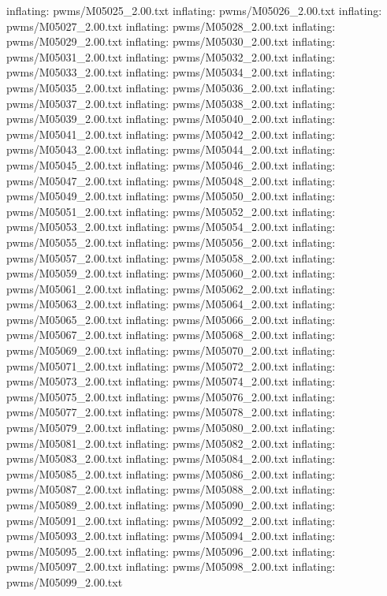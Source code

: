 \documentclass[letterpaper,10pt,english]{sphinxmanual}
\begin{document}
{\begin{sphinxVerbatim}[commandchars=\\\{\}]
  inflating: pwms/M05025\_2.00.txt
  inflating: pwms/M05026\_2.00.txt
  inflating: pwms/M05027\_2.00.txt
  inflating: pwms/M05028\_2.00.txt
  inflating: pwms/M05029\_2.00.txt
  inflating: pwms/M05030\_2.00.txt
  inflating: pwms/M05031\_2.00.txt
  inflating: pwms/M05032\_2.00.txt
  inflating: pwms/M05033\_2.00.txt
  inflating: pwms/M05034\_2.00.txt
  inflating: pwms/M05035\_2.00.txt
  inflating: pwms/M05036\_2.00.txt
  inflating: pwms/M05037\_2.00.txt
  inflating: pwms/M05038\_2.00.txt
  inflating: pwms/M05039\_2.00.txt
  inflating: pwms/M05040\_2.00.txt
  inflating: pwms/M05041\_2.00.txt
  inflating: pwms/M05042\_2.00.txt
  inflating: pwms/M05043\_2.00.txt
  inflating: pwms/M05044\_2.00.txt
  inflating: pwms/M05045\_2.00.txt
  inflating: pwms/M05046\_2.00.txt
  inflating: pwms/M05047\_2.00.txt
  inflating: pwms/M05048\_2.00.txt
  inflating: pwms/M05049\_2.00.txt
  inflating: pwms/M05050\_2.00.txt
  inflating: pwms/M05051\_2.00.txt
  inflating: pwms/M05052\_2.00.txt
  inflating: pwms/M05053\_2.00.txt
  inflating: pwms/M05054\_2.00.txt
  inflating: pwms/M05055\_2.00.txt
  inflating: pwms/M05056\_2.00.txt
  inflating: pwms/M05057\_2.00.txt
  inflating: pwms/M05058\_2.00.txt
  inflating: pwms/M05059\_2.00.txt
  inflating: pwms/M05060\_2.00.txt
  inflating: pwms/M05061\_2.00.txt
  inflating: pwms/M05062\_2.00.txt
  inflating: pwms/M05063\_2.00.txt
  inflating: pwms/M05064\_2.00.txt
  inflating: pwms/M05065\_2.00.txt
  inflating: pwms/M05066\_2.00.txt
  inflating: pwms/M05067\_2.00.txt
  inflating: pwms/M05068\_2.00.txt
  inflating: pwms/M05069\_2.00.txt
  inflating: pwms/M05070\_2.00.txt
  inflating: pwms/M05071\_2.00.txt
  inflating: pwms/M05072\_2.00.txt
  inflating: pwms/M05073\_2.00.txt
  inflating: pwms/M05074\_2.00.txt
  inflating: pwms/M05075\_2.00.txt
  inflating: pwms/M05076\_2.00.txt
  inflating: pwms/M05077\_2.00.txt
  inflating: pwms/M05078\_2.00.txt
  inflating: pwms/M05079\_2.00.txt
  inflating: pwms/M05080\_2.00.txt
  inflating: pwms/M05081\_2.00.txt
  inflating: pwms/M05082\_2.00.txt
  inflating: pwms/M05083\_2.00.txt
  inflating: pwms/M05084\_2.00.txt
  inflating: pwms/M05085\_2.00.txt
  inflating: pwms/M05086\_2.00.txt
  inflating: pwms/M05087\_2.00.txt
  inflating: pwms/M05088\_2.00.txt
  inflating: pwms/M05089\_2.00.txt
  inflating: pwms/M05090\_2.00.txt
  inflating: pwms/M05091\_2.00.txt
  inflating: pwms/M05092\_2.00.txt
  inflating: pwms/M05093\_2.00.txt
  inflating: pwms/M05094\_2.00.txt
  inflating: pwms/M05095\_2.00.txt
  inflating: pwms/M05096\_2.00.txt
  inflating: pwms/M05097\_2.00.txt
  inflating: pwms/M05098\_2.00.txt
  inflating: pwms/M05099\_2.00.txt

\end{sphinxVerbatim}}
\end{document}
